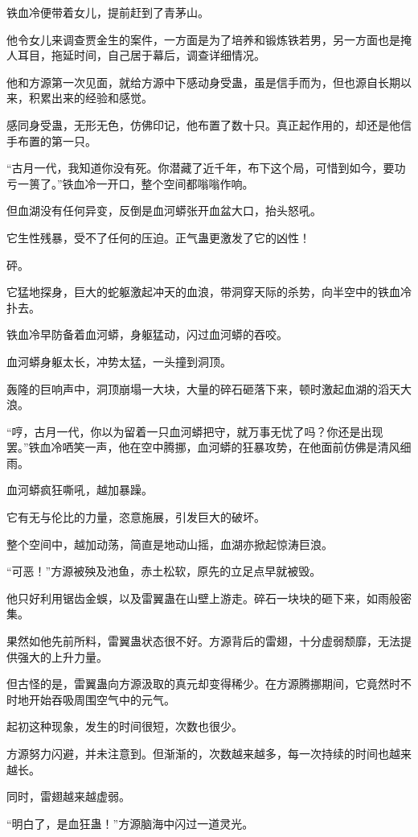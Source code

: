 \begin{this_body}
铁血冷便带着女儿，提前赶到了青茅山。

他令女儿来调查贾金生的案件，一方面是为了培养和锻炼铁若男，另一方面也是掩人耳目，拖延时间，自己居于幕后，调查详细情况。

他和方源第一次见面，就给方源中下感动身受蛊，虽是信手而为，但也源自长期以来，积累出来的经验和感觉。

感同身受蛊，无形无色，仿佛印记，他布置了数十只。真正起作用的，却还是他信手布置的第一只。

“古月一代，我知道你没有死。你潜藏了近千年，布下这个局，可惜到如今，要功亏一篑了。”铁血冷一开口，整个空间都嗡嗡作响。

但血湖没有任何异变，反倒是血河蟒张开血盆大口，抬头怒吼。

它生性残暴，受不了任何的压迫。正气蛊更激发了它的凶性！

砰。

它猛地探身，巨大的蛇躯激起冲天的血浪，带洞穿天际的杀势，向半空中的铁血冷扑去。

铁血冷早防备着血河蟒，身躯猛动，闪过血河蟒的吞咬。

血河蟒身躯太长，冲势太猛，一头撞到洞顶。

轰隆的巨响声中，洞顶崩塌一大块，大量的碎石砸落下来，顿时激起血湖的滔天大浪。

“哼，古月一代，你以为留着一只血河蟒把守，就万事无忧了吗？你还是出现罢。”铁血冷哂笑一声，他在空中腾挪，血河蟒的狂暴攻势，在他面前仿佛是清风细雨。

血河蟒疯狂嘶吼，越加暴躁。

它有无与伦比的力量，恣意施展，引发巨大的破坏。

整个空间中，越加动荡，简直是地动山摇，血湖亦掀起惊涛巨浪。

“可恶！”方源被殃及池鱼，赤土松软，原先的立足点早就被毁。

他只好利用锯齿金蜈，以及雷翼蛊在山壁上游走。碎石一块块的砸下来，如雨般密集。

果然如他先前所料，雷翼蛊状态很不好。方源背后的雷翅，十分虚弱颓靡，无法提供强大的上升力量。

但古怪的是，雷翼蛊向方源汲取的真元却变得稀少。在方源腾挪期间，它竟然时不时地开始吞吸周围空气中的元气。

起初这种现象，发生的时间很短，次数也很少。

方源努力闪避，并未注意到。但渐渐的，次数越来越多，每一次持续的时间也越来越长。

同时，雷翅越来越虚弱。

“明白了，是血狂蛊！”方源脑海中闪过一道灵光。


\end{this_body}
